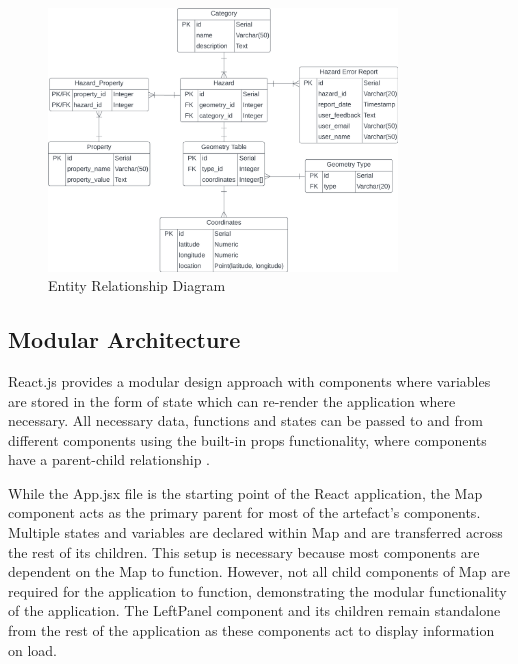 \begin{figure}[!ht]
  \centering
  \includegraphics[width=350px]{figures/erd.png}
  \caption{Entity Relationship Diagram}
  \label{fig:erd}
\end{figure}

\subsection{Modular Architecture}
\label{system:modular-architecture}
React.js provides a modular design approach with components where variables are stored in the form of state which can re-render the application where necessary. All necessary data, functions and states can be passed to and from different components using the built-in props functionality, where components have a parent-child relationship .

While the App.jsx file is the starting point of the React application, the Map component acts as the primary parent for most of the artefact's components. Multiple states and variables are declared within Map and are transferred across the rest of its children. This setup is necessary because most components are dependent on the Map to function. However, not all child components of Map are required for the application to function, demonstrating the modular functionality of the application. The LeftPanel component and its children remain standalone from the rest of the application as these components act to display information on load.

